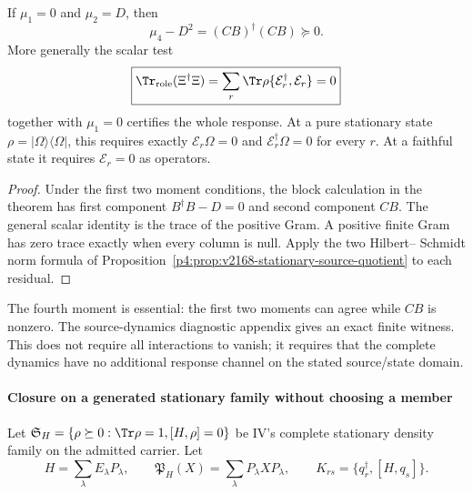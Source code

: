\documentclass[12pt,a4paper]{article}
\begin{document}
\begin{corollary}
\label{p4:cor:v2168-positive-source-leakage}
If $\mu_1=0$ and $\mu_2=D$, then
\[
 \boxed{\mu_4-D^2=(CB)^\dagger(CB)\succeq0.}
\]
More generally the scalar test
\[
 \boxed{\Tr_{\rm role}(\Xi^\dagger\Xi)
 =\sum_r\Tr\rho\{\mathcal E_r^\dagger,\mathcal E_r\}=0}
\]
together with $\mu_1=0$ certifies the whole response. At a pure stationary
state $\rho=|\Omega\rangle\langle\Omega|$, this requires exactly
$\mathcal E_r\Omega=0$ and $\mathcal E_r^\dagger\Omega=0$ for every $r$.
At a faithful state it requires $\mathcal E_r=0$ as operators.
\end{corollary}
\begin{proof}
Under the first two moment conditions, the block calculation in the theorem
has first component $B^\dagger B-D=0$ and second component $CB$. The general
scalar identity is the trace of the positive Gram. A positive finite Gram
has zero trace exactly when every column is null. Apply the two Hilbert--
Schmidt norm formula of Proposition~\ref{p4:prop:v2168-stationary-source-quotient} to each
residual.
\end{proof}

The fourth moment is essential: the first two moments can agree while $CB$
is nonzero. The source-dynamics diagnostic appendix gives an exact finite witness. This does not require
all interactions to vanish; it requires that the complete dynamics have no
additional response channel on the stated source/state domain.



\paragraph{Closure on a generated stationary family without choosing a member}
Let $\mathfrak S_H=\{\rho\succeq0:\Tr\rho=1,[H,\rho]=0\}$ be IV's complete
stationary density family on the admitted carrier. Let
\[
 H=\sum_\lambda E_\lambda P_\lambda,
 \qquad \mathfrak P_H(X)=\sum_\lambda P_\lambda XP_\lambda,
 \qquad K_{rs}=\{q_r^\dagger,[H,q_s]\}.
\]
\end{document}
